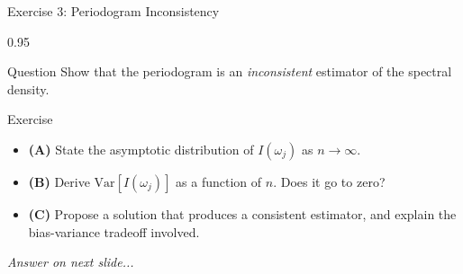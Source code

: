 \documentclass[9pt, aspectratio=169, t]{beamer}
\begin{document}
\begin{frame}{Exercise 3: Periodogram Inconsistency}
    \begin{cminipage}{0.95\textwidth}
    \begin{alertblock}{Question}
        Show that the periodogram is an \emph{inconsistent} estimator of the spectral density.
    \end{alertblock}

    \vspace{0.2cm}

    \begin{block}{Exercise}
        \begin{itemize}\setlength{\itemsep}{3pt}
            \item \textcolor{MainBlue}{\textbf{(A)}} State the asymptotic distribution of $I(\omega_j)$ as $n \to \infty$.
            \item \textcolor{MainBlue}{\textbf{(B)}} Derive $\text{Var}[I(\omega_j)]$ as a function of $n$. Does it go to zero?
            \item \textcolor{MainBlue}{\textbf{(C)}} Propose a solution that produces a consistent estimator, and explain the bias-variance tradeoff involved.
        \end{itemize}
    \end{block}

    \vspace{0.3cm}

    \begin{center}
        \textit{Answer on next slide...}
    \end{center}
    \end{cminipage}
\end{frame}
\end{document}
